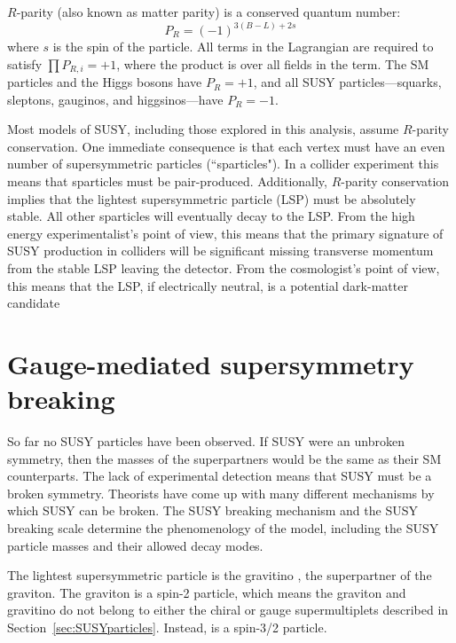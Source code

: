$R$-parity (also known as matter parity) is a conserved quantum number:
\begin{equation}
P_R = (-1)^{3(B-L)+2s}
\end{equation}
where $s$ is the spin of the particle. All terms in the Lagrangian are required to satisfy $\prod P_{R,i} = +1$, where the product
is over all fields in the term. The SM particles and the Higgs bosons have $P_R = +1$, and
all SUSY particles---squarks, sleptons, gauginos, and higgsinos---have $P_R = -1$.

Most models of SUSY, including those explored in this analysis, assume $R$-parity conservation.
One immediate consequence is that each vertex must have an even number of supersymmetric particles (``sparticles").
In a collider experiment 
this means that sparticles must be pair-produced.
Additionally, $R$-parity conservation implies that the lightest supersymmetric particle (LSP) must be absolutely stable.
All other sparticles will eventually decay to the LSP. From the high energy experimentalist's point of view, this means that the 
primary signature of SUSY production in colliders will be significant missing transverse momentum from the stable LSP 
leaving the detector. From the cosmologist's point of view, this means that the LSP, if electrically neutral, 
is a potential dark-matter candidate


\section{Gauge-mediated supersymmetry breaking}
\label{sec:gmsb}

So far no SUSY particles have been observed. If SUSY were an unbroken symmetry, then the masses of the superpartners
would be the same as their SM counterparts. The lack of experimental detection means that SUSY must be a broken symmetry.
Theorists have come up with many different mechanisms by which SUSY can be broken. The SUSY breaking mechanism and the SUSY breaking scale 
determine the phenomenology of the model, including the SUSY particle masses and their allowed decay modes.

The lightest supersymmetric particle is the gravitino \gravitino, the superpartner of the graviton. The graviton is a spin-2 particle, which means the graviton and gravitino do not belong to either the chiral or gauge supermultiplets described in Section~\ref{sec:SUSYparticles}. Instead, \gravitino is a spin-3/2 particle.


